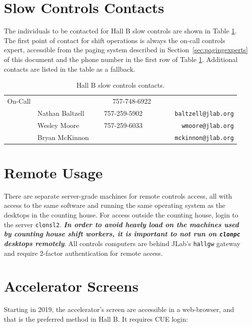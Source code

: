 \documentclass[amsmath,amssymb,notitlepage,11pt]{revtex4}
\begin{document}
\section{Slow Controls Contacts}
The individuals to be contacted for Hall B slow controls are shown in Table \ref{tab:experts}.  The first point of contact for shift operations is always the on-call controls expert, accessible from the paging system described in Section~\ref{sec:pagingexperts} of this document and the phone number in the first row of Table \ref{tab:experts}.  Additional contacts are listed in the table as a fallback.

\begin{table}[htbp]\centering
    \begin{tabular}{llcr}\toprule[1.5pt]
        On-Call & & \ \ \ \ \ 757-748-6922 & \\ \cmidrule[0.5pt]{1-4}
         & Nathan Baltzell & 757-259-5902 & \ \ \ \ \ \texttt{baltzell@jlab.org} \\
                & Wesley Moore & 757-259-6033 &  \texttt{wmoore@jlab.org} \\
                & Bryan McKinnon & & \texttt{mckinnon@jlab.org} \\
        \bottomrule[1.5pt]
    \end{tabular}
    \caption{Hall B slow controls contacts.\label{tab:experts}}
\end{table}

\section{Remote Usage}\label{sec:remote}
There are separate server-grade machines for remote controls access, all with access to the same software and running the same operating system as the desktops in the counting house.  For access outside the counting house, login to the server \texttt{clonsl2}.  {\bf\em In order to avoid heavly load on the machines used by counting house shift workers, it is important to not run on \texttt{clonpc} desktops remotely}.  All controls computers are behind JLab's \texttt{hallgw} gateway and require 2-factor authentication for remote access.  

\section{Accelerator Screens}
Starting in 2019, the accelerator's screen are accessible in a web-browser, and that is the preferred method in Hall B.  It requires CUE login:
\end{document}
